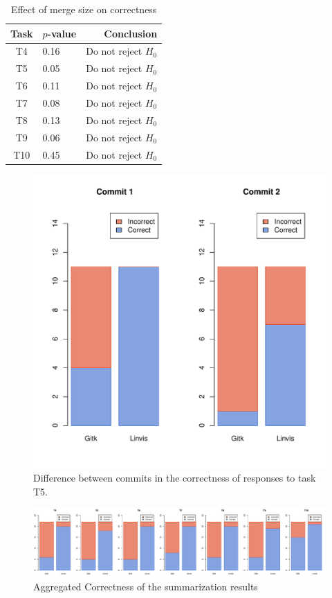 \begin{table}[htpb]
  \centering
  \caption{Effect of merge size on correctness}
  \label{tab:cross_commit_correctness}
  \begin{tabular}{clr}
    \toprule
    Task & $p$-value & Conclusion\\\midrule
    T4   & 0.16      & Do not reject $H_0$\\
    T5   & 0.05      & Do not reject $H_0$\\
    T6   & 0.11      & Do not reject $H_0$\\
    T7   & 0.08      & Do not reject $H_0$\\
    T8   & 0.13      & Do not reject $H_0$\\
    T9   & 0.06      & Do not reject $H_0$\\
    T10  & 0.45      & Do not reject $H_0$\\
    \bottomrule
  \end{tabular}
\end{table}


\begin{figure}[htpb]
  \centering
  \includegraphics[width=0.4\linewidth]{Figures/evaluation/correctness/5.pdf}
  \caption{Difference between commits in the correctness of responses to task T5.}
  \label{fig:T5_correctness}
\end{figure}


\begin{figure}[htpb]
  \centering
  \includegraphics[width=1.0\linewidth]{Figures/evaluation/correctness.pdf}
  \caption{Aggregated Correctness of the summarization results}
  \label{fig:agg_correctness}
\end{figure}

